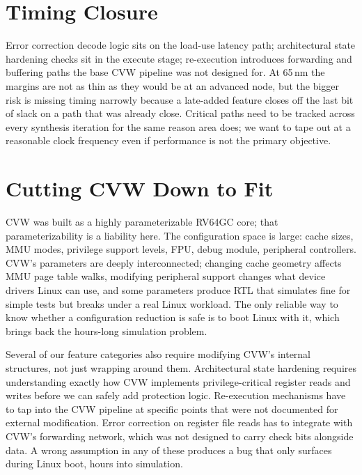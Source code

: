 \documentclass[12pt]{article}
\begin{document}
\section{Timing Closure}

Error correction decode logic sits on the load-use latency path;
architectural state hardening checks sit in the execute stage;
re-execution introduces forwarding and buffering paths the base CVW
pipeline was not designed for. At 65\,nm the margins are not as thin as
they would be at an advanced node, but the bigger risk is missing timing
narrowly because a late-added feature closes off the last bit of slack
on a path that was already close. Critical paths need to be tracked
across every synthesis iteration for the same reason area does; we want
to tape out at a reasonable clock frequency even if performance is not
the primary objective.

\section{Cutting CVW Down to Fit}

CVW was built as a highly parameterizable RV64GC core; that
parameterizability is a liability here. The configuration space is
large: cache sizes, MMU modes, privilege support levels, FPU, debug
module, peripheral controllers. CVW's parameters are deeply
interconnected; changing cache geometry affects MMU page table walks,
modifying peripheral support changes what device drivers Linux can use,
and some parameters produce RTL that simulates fine for simple tests but
breaks under a real Linux workload. The only reliable way to know
whether a configuration reduction is safe is to boot Linux with it,
which brings back the hours-long simulation problem.

Several of our feature categories also require modifying CVW's internal
structures, not just wrapping around them. Architectural state hardening
requires understanding exactly how CVW implements privilege-critical
register reads and writes before we can safely add protection logic.
Re-execution mechanisms have to tap into the CVW pipeline at specific
points that were not documented for external modification. Error
correction on register file reads has to integrate with CVW's forwarding
network, which was not designed to carry check bits alongside data. A
wrong assumption in any of these produces a bug that only surfaces
during Linux boot, hours into simulation.
\end{document}
